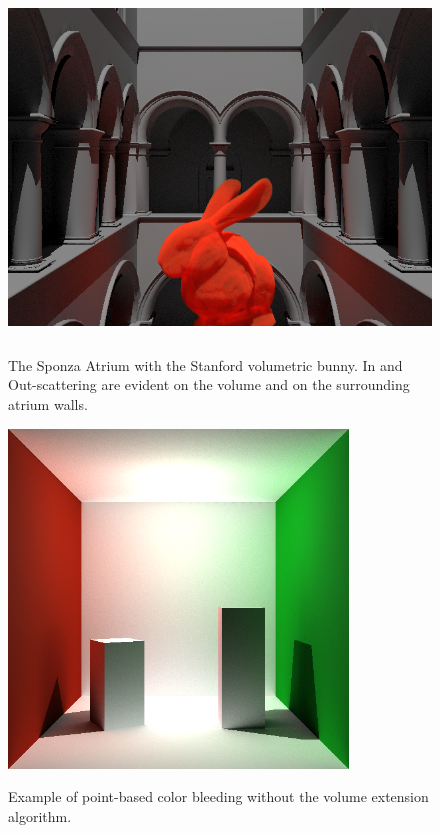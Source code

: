 \documentclass[12pt]{ucthesis}
\newcommand{\captionfonts}{\small\bf\ssp}
\begin{document}
\begin{figure}[h!]
    \centering
    \includegraphics[height=90mm]{img/sponza.png}
    \captionfonts
    \caption{The Sponza Atrium with the Stanford volumetric bunny.  In and Out-scattering are evident on the volume and on the surrounding atrium walls.}
\end{figure}

\begin{figure}[h!]
    \centering
    \includegraphics[height=90mm]{img/indirect_box_high.png}
    \captionfonts
    \caption{Example of point-based color bleeding without the volume extension algorithm.}
\end{figure}
\end{document}
